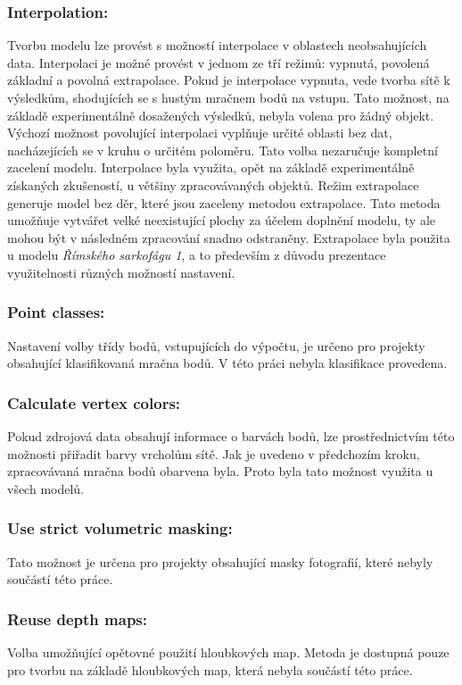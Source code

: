 \documentclass[a4paper, 12pt]{report}
\begin{document}
\subsubsection*{Interpolation:}
Tvorbu modelu lze provést s možností interpolace v oblastech neobsahujících data. Interpolaci je možné provést v jednom ze tří režimů: vypnutá, povolená základní a povolná extrapolace. Pokud je interpolace vypnuta, vede tvorba sítě k výsledkům, shodujících se s hustým mračnem bodů na vstupu. Tato možnost, na základě experimentálně dosažených výsledků, nebyla volena pro žádný objekt. Výchozí možnost povolující interpolaci vyplňuje určité oblasti bez dat, nacházejících se v kruhu o určitém poloměru. Tato volba nezaručuje kompletní zacelení modelu. Interpolace byla využita, opět na základě experimentálně získaných zkušeností, u většiny zpracovávaných objektů. Režim extrapolace generuje model bez děr, které jsou zaceleny metodou extrapolace. Tato metoda umožňuje vytvářet velké neexistující plochy za účelem doplnění modelu, ty ale mohou být v následném zpracování snadno odstraněny. Extrapolace byla použita u modelu \textit{Římského sarkofágu 1}, a to především z důvodu prezentace využitelnosti různých možností nastavení.

\subsubsection*{Point classes:}
Nastavení volby třídy bodů, vstupujících do výpočtu, je určeno pro projekty obsahující klasifikovaná mračna bodů. V této práci nebyla klasifikace provedena.

\subsubsection*{Calculate vertex colors:}
Pokud zdrojová data obsahují informace o barvách bodů, lze prostřednictvím této možnosti přiřadit barvy vrcholům sítě. Jak je uvedeno v předchozím kroku, zpracovávaná mračna bodů obarvena byla. Proto byla tato možnost využita u všech modelů. 

\subsubsection*{Use strict volumetric masking:}
Tato možnost je určena pro projekty obsahující masky fotografií, které nebyly součástí této práce.

\subsubsection*{Reuse depth maps:}
Volba umožňující opětovné použití hloubkových map. Metoda je dostupná pouze pro tvorbu na základě hloubkových map, která nebyla součástí této práce.
\end{document}
